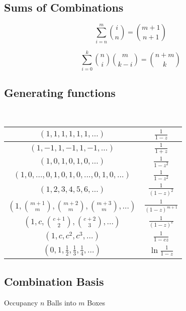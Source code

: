\documentclass[a4paper]{amsart}
\begin{document}
    \subsection{Sums of Combinations}

    \begin{equation*}
     \sum_{i = n}^m \binom{i}{n} = \binom{m + 1}{n + 1}
    \end{equation*}

    \begin{equation*}
     \sum_{i = 0}^k \binom{n}{i} \binom{m}{k - i} = \binom{n + m}{k}
    \end{equation*}


    \subsection{Generating functions}
      \ 

      \begin{tabular}{|c|c|}
        \hline
        $(1,1,1,1,1,1,\ldots)$ & $\frac{1}{1-z}$ \\ \hline
        $(1,-1,1,-1,1,-1,\ldots)$ & $\frac{1}{1+z}$ \\ \hline
        $(1,0,1,0,1,0,\ldots)$ & $\frac{1}{1-z^2}$ \\ \hline
        $(1,0,\ldots,0,1,0,1,0,\ldots,0,1,0,\ldots)$ & $\frac{1}{1-z^2}$ \\ \hline
        $(1,2,3,4,5,6,\ldots)$ & $\frac{1}{(1-z)^2}$ \\ \hline
        $(1,\binom{m+1}{m},\binom{m+2}{m},\binom{m+3}{m},\ldots)$ & $\frac{1}{(1-z)^{m+1}}$ \\ \hline
        $(1,c,\binom{c+1}{2},\binom{c+2}{3},\ldots)$ & $\frac{1}{(1-z)^c}$ \\ \hline
        $(1,c,c^2, c^3, \ldots)$ & $\frac{1}{1-cz}$ \\ \hline
        $(0,1,\frac{1}{2},\frac{1}{3},\frac{1}{4},\ldots)$ & $\ln \frac{1}{1-z}$ \\ \hline
      \end{tabular}
      
    \subsection{Combination Basis}
    		Occupancy $n$ Balls into $m$ Boxes
      \ 
\end{document}

